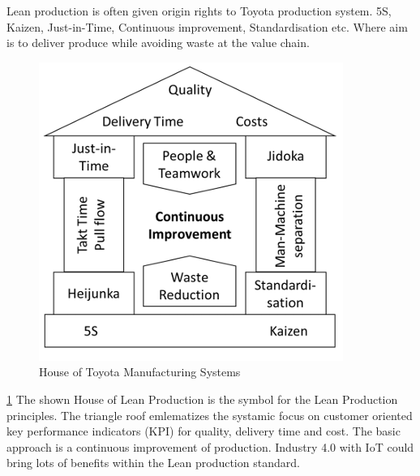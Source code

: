 \documentclass[article,a4paper]{IEEEtran}
\begin{document}
    \newline\newline
    Lean production is often given origin rights to Toyota production system. 5S, Kaizen, Just-in-Time, Continuous improvement, Standardisation etc. Where aim is to deliver produce while avoiding waste at the value chain. 
    \begin{figure}
        \includegraphics{HouseofToyota.png} 
        \caption{House of Toyota Manufacturing Systems}
        \label{fig1:House of Toyota Manufacturing System}   
    \end{figure}
    \ref{fig1:House of Toyota Manufacturing System}
    The shown House of Lean Production is the symbol for the Lean Production principles. The triangle roof emlematizes the systamic focus on customer oriented key performance indicators (KPI) for quality, delivery time and cost. The basic approach is a continuous improvement of production. Industry 4.0 with IoT could bring lots of benefits within the Lean production standard. \cite{Impact_Lean_Prod}
    \newline\newline
    
\end{document}
